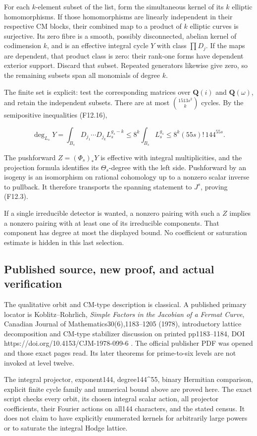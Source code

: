 For each \(k\)-element subset of the list, form the simultaneous kernel
of its \(k\) elliptic homomorphisms. If those homomorphisms are linearly
independent in their respective CM blocks, their combined map to a
product of \(k\) elliptic curves is surjective. Its zero fibre is a
smooth, possibly disconnected, abelian kernel of codimension \(k\), and
is an effective integral cycle \(Y\) with class \(\prod D_j\). If the
maps are dependent, that product class is zero: their rank-one forms
have dependent exterior support. Discard that subset. Repeated
generators likewise give zero, so the remaining subsets span all
monomials of degree \(k\).

The finite set is explicit: test the corresponding matrices over
\(\mathbf Q(i)\) and \(\mathbf Q(\omega)\), and retain the independent
subsets. There are at most \(\binom{1513s^2}{k}\) cycles. By the
semipositive inequalities (F12.16),

\[
 \deg_{L_s}Y
 =\int_{B_s}D_{j_1}\cdots D_{j_k}L_s^{g_s-k}
 \le8^k\int_{B_s}L_s^{g_s}
 \le8^k(55s)!\,144^{55s}.
 \tag{F12.17}
\]

The pushforward \(Z=(\Phi_s)_*Y\) is effective with integral
multiplicities, and the projection formula identifies its
\(\Theta_s\)-degree with the left side. Pushforward by an isogeny is an
isomorphism on rational cohomology up to a nonzero scalar inverse to
pullback. It therefore transports the spanning statement to \(J^s\),
proving (F12.3).

If a single irreducible detector is wanted, a nonzero pairing with such
a \(Z\) implies a nonzero pairing with at least one of its irreducible
components. That component has degree at most the displayed bound. No
coefficient or saturation estimate is hidden in this last selection.

\subsection{Published source, new proof, and actual
verification}\label{published-source-new-proof-and-actual-verification}

The qualitative orbit and CM-type description is classical. A published
primary locator is Koblitz--Rohrlich, \emph{Simple Factors in the
Jacobian of a Fermat Curve}, Canadian Journal of
Mathematics30(6),1183--1205 (1978), introductory lattice decomposition
and CM-type stabilizer discussion on printed pp1183--1184, DOI
https://doi.org/10.4153/CJM-1978-099-6 . The official publisher PDF was
opened and those exact pages read. Its later theorems for prime-to-six
levels are not invoked at level twelve.

The integral projector, exponent144, degree144\^{}55, binary Hermitian
comparison, explicit finite cycle family and numerical bound above are
proved here. The exact script checks every orbit, its chosen integral
scalar action, all projector coefficients, their Fourier actions on
all144 characters, and the stated census. It does not claim to have
explicitly enumerated kernels for arbitrarily large powers or to
saturate the integral Hodge lattice.
